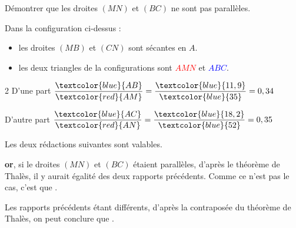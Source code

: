 \begin{methode*1}
\begin{minipage}{8cm}
                \vspace*{1cm}
                Démontrer que les droites $(MN)$ et $(BC)$ ne sont pas parallèles.
            \end{minipage}
            
            \correction
            Dans la configuration ci-dessus : 
            \begin{itemize}
                \item les droites $(MB)$ et $(CN)$ sont sécantes en $A$.                
                \item les deux triangles de la configurations sont \textcolor{red}{$AMN$} et \textcolor{blue}{$ABC$}.
            \end{itemize}
            \begin{spacing}2
                D'une part $\dfrac{\textcolor{blue}{AB}}{\textcolor{red}{AM}} = \dfrac{\textcolor{blue}{11,9}}{\textcolor{blue}{35}}=0,34$

                D'autre part $\dfrac{\textcolor{blue}{AC}}{\textcolor{red}{AN}} = \dfrac{\textcolor{blue}{18,2}}{\textcolor{blue}{52}}=0,35$
            \end{spacing}

            \begin{remarque}
                Les deux rédactions suivantes sont valables.
            \end{remarque}
            
            \hspace*{0.5cm}

            \begin{minipage}{8cm}
                \textbf{or}, si le droites $(MN)$ et $(BC)$ étaient parallèles, d'après le théorème de Thalès, il y aurait égalité des deux rapports
                précédents. Comme ce n'est pas le cas, c'est que .
    
            \end{minipage}
            \hspace*{0.5cm}
            \vrule
            \hspace*{0.5cm}
            \begin{minipage}{8cm}
                Les rapports précédents étant différents, d'après la contraposée du théorème de Thalès, on peut conclure que .
            \end{minipage}
        \end{methode*1}


